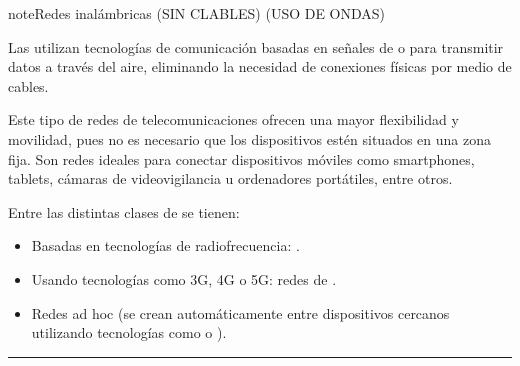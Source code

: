 \documentclass[letterpaper,10pt,spanish]{sphinxmanual}
\begin{document}
\begin{sphinxadmonition}{note}{Redes inalámbricas (SIN CLABLES) (USO DE ONDAS)}

\sphinxAtStartPar
Las  utilizan tecnologías de comunicación basadas en señales de  o  para transmitir datos a través del aire, eliminando la necesidad de conexiones físicas por medio de cables.

\sphinxAtStartPar
Este tipo de redes de telecomunicaciones ofrecen una mayor flexibilidad y movilidad, pues no es necesario que los dispositivos estén situados en una zona fija. Son redes ideales para conectar dispositivos móviles como smartphones, tablets, cámaras de video\sphinxhyphen{}vigilancia u ordenadores portátiles, entre otros.

\sphinxAtStartPar
Entre las distintas clases de  se tienen:
\begin{itemize}
\item {} 
\sphinxAtStartPar
Basadas en tecnologías de radiofrecuencia: .

\item {} 
\sphinxAtStartPar
Usando tecnologías como 3G, 4G o 5G: redes de .

\item {} 
\sphinxAtStartPar
Redes ad hoc (se crean automáticamente entre dispositivos cercanos utilizando tecnologías como  o ).

\end{itemize}
\end{sphinxadmonition}


\bigskip\hrule\bigskip
\end{document}

